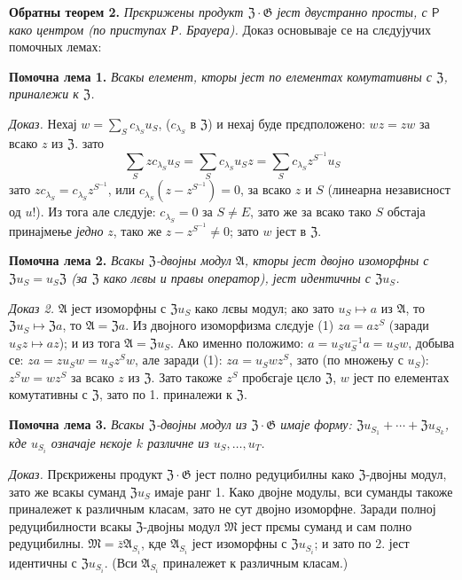 \documentclass[11pt]{article}
\begin{document}
\noindent\textbf{Обратны теорем 2.} \emph{Прєкрижены продукт \(\mathfrak Z\cdot\mathfrak G\) јест двустранно просты, с \(\mathsf{P}\) како центром (по приступах Р. Брауера).} Доказ основываје се на слєдујучих помочных лемах:

\noindent\textbf{Помочна лема 1.} \emph{Всакы елемент, кторы јест по елементах комутативны с \(\mathfrak Z\), приналежи к \(\mathfrak Z\).}

\noindent\emph{Доказ.} Нехај \(w=\sum_S c_{\lambda_S}u_S\), (\(c_{\lambda_S}\) в \(\mathfrak Z\)) и нехај буде прєдположено: \(wz=zw\) за всако \(z\) из \(\mathfrak Z\). зато
\[
\sum_S zc_{\lambda_S}u_S
 =\sum_S c_{\lambda_S}u_Sz
 =\sum_S c_{\lambda_S}z^{S^{-1}}u_S
\]
зато \(zc_{\lambda_S}=c_{\lambda_S}z^{S^{-1}}\), или \(c_{\lambda_S}(z-z^{S^{-1}})=0\), за всако \(z\) и \(S\) (линеарна независност од \(u\)!). Из тога але слєдује: \(c_{\lambda_S}=0\) за \(S\neq E\), зато же за всако тако \(S\) обстаја принајмење \emph{једно} \(z\), тако же \(z-z^{S^{-1}}\neq0\); зато \(w\) јест в \(\mathfrak Z\).

\noindent\textbf{Помочна лема 2.} \emph{Всакы \(\mathfrak Z\)-двојны модул \(\mathfrak A\), кторы јест двојно изоморфны с \(\mathfrak Zu_S=u_S\mathfrak Z\) (за \(\mathfrak Z\) како лєвы и правы оператор), јест идентичны с \(\mathfrak Zu_S\).}

\noindent\emph{Доказ 2.} \(\mathfrak A\) јест изоморфны с \(\mathfrak Zu_S\) како лєвы модул; ако зато \(u_S\mapsto a\) из \(\mathfrak A\), то \(\mathfrak Zu_S\mapsto\mathfrak Za\), то \(\mathfrak A=\mathfrak Za\). Из двојного изоморфизма слєдује (1) \(za=az^S\) (заради \(u_Sz\mapsto az\)); и из тога \(\mathfrak A=\mathfrak Zu_S\). Ако именно положимо: \(a=u_Su_S^{-1}a=u_Sw\), добыва се: \(za=zu_Sw=u_Sz^Sw\), але заради (1): \(za=u_Swz^S\), зато (по множењу с \(u_S\)): \(z^Sw=wz^S\) за всако \(z\) из \(\mathfrak Z\). Зато такоже \(z^S\) пробєгаје цєло \(\mathfrak Z\), \(w\) јест по елементах комутативны с \(\mathfrak Z\), зато по 1. приналежи к \(\mathfrak Z\).

\noindent\textbf{Помочна лема 3.} \emph{Всакы \(\mathfrak Z\)-двојны модул из \(\mathfrak Z\cdot\mathfrak G\) имаје форму: \(\mathfrak Zu_{S_1}+\cdots+\mathfrak Zu_{S_k}\), кде \(u_{S_i}\) означаје нєкоје \(k\) различне из \(u_S,\ldots,u_T\).}

\noindent\emph{Доказ.} Прєкрижены продукт \(\mathfrak Z\cdot\mathfrak G\) јест полно редуцибилны како \(\mathfrak Z\)-двојны модул, зато же всакы суманд \(\mathfrak Zu_S\) имаје ранг 1. Како двојне модулы, вси суманды такоже приналежет к различным класам, зато не сут двојно изоморфне. Заради полној редуцибилности всакы \(\mathfrak Z\)-двојны модул \(\mathfrak M\) јест прємы суманд и сам полно редуцибилны. \(\mathfrak M=\bar z\mathfrak A_{S_i}\), кде \(\mathfrak A_{S_i}\) јест изоморфны с \(\mathfrak Zu_{S_i}\); и зато по 2. јест идентичны с \(\mathfrak Zu_{S_i}\). (Вси \(\mathfrak A_{S_i}\) приналежет к различным класам.)
\end{document}
